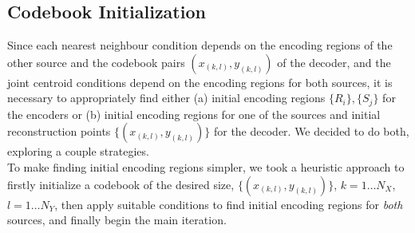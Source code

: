 \documentclass[10pt]{article}
\begin{document}




\subsection{Codebook Initialization}

Since each nearest neighbour condition depends on the encoding regions of the other source and the codebook pairs $(x_{(k,l)},y_{(k,l)})$ of the decoder, and the joint centroid conditions depend on the encoding regions for both sources, it is necessary to appropriately find either (a) initial encoding regions $\{R_i\}, \{S_j\}$ for the encoders or (b) initial encoding regions for one of the sources and initial reconstruction points $\{(x_{(k,l)}, y_{(k,l)})\}$ for the decoder. We decided to do both, exploring a couple strategies.\\


To make finding initial encoding regions simpler, we took a heuristic approach to firstly initialize a codebook of the desired size, $\{(x_{(k,l)}, y_{(k,l)})\}$, $k=1\ldots N_X$, $l=1\ldots N_Y$, then apply suitable conditions to find initial encoding regions for \emph{both} sources, and finally begin the main iteration.\\
\end{document}
